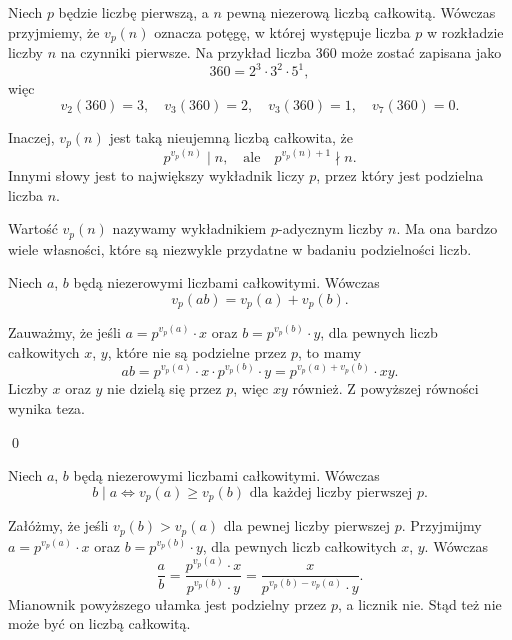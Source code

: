 



\noindent
Niech $p$ będzie liczbę pierwszą, a $n$ pewną niezerową liczbą całkowitą. Wówczas przyjmiemy, że $v_p(n)$ oznacza potęgę, w której występuje liczba $p$ w rozkładzie liczby $n$ na czynniki pierwsze. Na przykład liczba $360$ może zostać zapisana jako
\[
	360 = 2^3 \cdot 3^2 \cdot 5^1,
\]
więc
\[
	v_2(360) = 3, \quad v_3(360) = 2, \quad v_3(360) = 1, \quad v_7(360) = 0.
\]

\vspace{10px}

\noindent
Inaczej, $v_p(n)$ jest taką nieujemną liczbą całkowita, że 
\[
	p^{v_p(n)} \mid n, \quad \text{ale} \quad p^{v_p(n) + 1} \nmid n.
\]
Innymi słowy jest to największy wykładnik liczy $p$, przez który jest podzielna liczba $n$.


\vspace{10px}

\noindent
Wartość $v_p(n)$ nazywamy wykładnikiem $p$-adycznym liczby $n$. Ma ona bardzo wiele własności, które są niezwykle przydatne w badaniu podzielności liczb.

\vspace{10px}


\noindent
Niech $a$, $b$ będą niezerowymi liczbami całkowitymi. Wówczas
\[
	v_p(ab) = v_p(a) + v_p(b).
\]


\noindent
Zauważmy, że jeśli $a = p^{v_p(a)} \cdot x$ oraz $b = p^{v_p(b)} \cdot y$, dla pewnych liczb całkowitych $x$, $y$, które nie są podzielne przez $p$, to mamy
\[
	ab = p^{v_p(a)} \cdot x \cdot p^{v_p(b)} \cdot y = p^{v_p(a) + v_p(b)} \cdot xy.
\] 
Liczby $x$ oraz $y$ nie dzielą się przez $p$, więc $xy$ również. Z powyższej równości wynika teza. 

\qed

\vspace{10px}


\noindent
Niech $a$, $b$ będą niezerowymi liczbami całkowitymi. Wówczas 
\[
	b \mid a \iff v_p(a) \geqslant v_p(b) \text{ dla każdej liczby pierwszej $p$.}
\]


\noindent
Załóżmy, że jeśli $v_p(b) > v_p(a)$ dla pewnej liczby pierwszej $p$. Przyjmijmy $a = p^{v_p(a)} \cdot x$ oraz $b = p^{v_p(b)} \cdot y$, dla pewnych liczb całkowitych $x$, $y$. Wówczas
\[
	\frac{a}{b} = \frac{p^{v_p(a)} \cdot x}{p^{v_p(b)} \cdot y}= \frac{x}{p^{v_p(b) - v_p(a)} \cdot y}.
\]
Mianownik powyższego ułamka jest podzielny przez $p$, a licznik nie. Stąd też nie może być on liczbą całkowitą.

